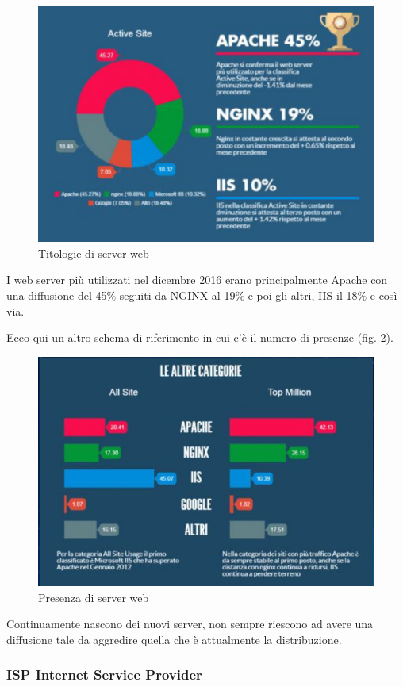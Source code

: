\begin{figure}[ht]
    \centering
    \includegraphics[width=0.8\linewidth]{images/03_lez_fig_02.jpg}
    \caption{Titologie di server web}
    \label{fig:Tipologie di server web}
\end{figure}

I web server più utilizzati nel dicembre 2016 erano principalmente Apache con una diffusione del 45\% seguiti da NGINX al 19\% e poi gli altri, IIS il 18\% e così via. 

Ecco qui un altro schema di riferimento in cui c'è il numero di presenze (fig. \ref{fig:presenza di server web}).
\begin{figure}[ht]
    \centering
    \includegraphics[width=0.8\linewidth]{images/03_lez_fig_03.jpg}
    \caption{Presenza di server web}
    \label{fig:presenza di server web}
\end{figure}

Continuamente nascono dei nuovi server, non sempre riescono ad avere una diffusione tale da aggredire quella che è attualmente la distribuzione.

\subsubsection{ISP Internet Service Provider}


